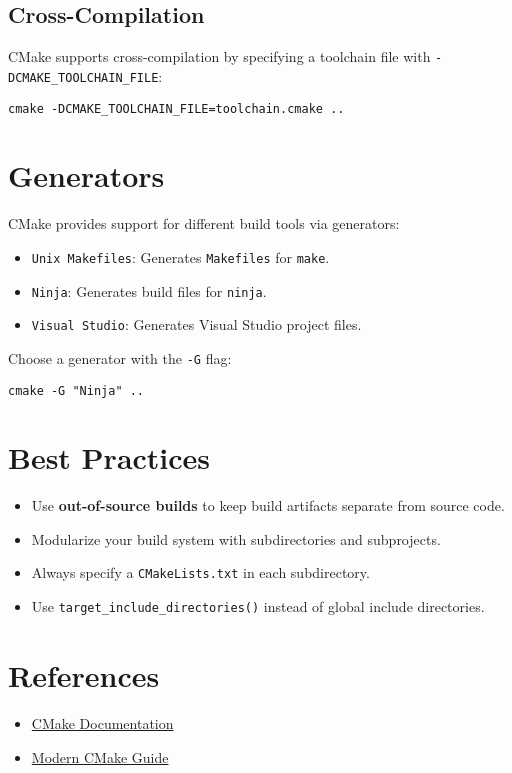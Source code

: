 \subsection*{Cross-Compilation}
CMake supports cross-compilation by specifying a toolchain file with \texttt{-DCMAKE\_TOOLCHAIN\_FILE}:
\begin{verbatim}
cmake -DCMAKE_TOOLCHAIN_FILE=toolchain.cmake ..
\end{verbatim}

\section*{Generators}
CMake provides support for different build tools via generators:
\begin{itemize}
    \item \texttt{Unix Makefiles}: Generates \texttt{Makefiles} for \texttt{make}.
    \item \texttt{Ninja}: Generates build files for \texttt{ninja}.
    \item \texttt{Visual Studio}: Generates Visual Studio project files.
\end{itemize}
Choose a generator with the \texttt{-G} flag:
\begin{verbatim}
cmake -G "Ninja" ..
\end{verbatim}

\section*{Best Practices}
\begin{itemize}
    \item Use \textbf{out-of-source builds} to keep build artifacts separate from source code.
    \item Modularize your build system with subdirectories and subprojects.
    \item Always specify a \texttt{CMakeLists.txt} in each subdirectory.
    \item Use \texttt{target\_include\_directories()} instead of global include directories.
\end{itemize}

\section*{References}
\begin{itemize}
    \item \href{https://cmake.org/documentation/}{CMake Documentation}
    \item \href{https://cliutils.gitlab.io/modern-cmake/}{Modern CMake Guide}
\end{itemize}